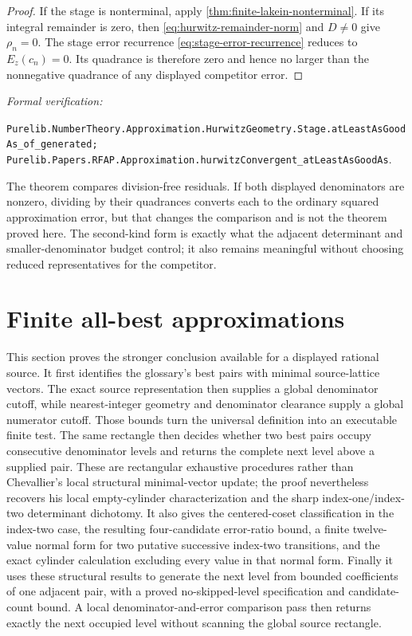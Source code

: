 \documentclass[11pt]{article}
\newcommand{\leanref}[1]{\par\smallskip\noindent
  \emph{Formal verification:}\par\nobreak
  {\raggedright\nolinkurl{#1}.\par}}
\begin{document}
\begin{proof}
If the stage is nonterminal, apply
\cref{thm:finite-lakein-nonterminal}.  If its integral remainder is zero,
then \eqref{eq:hurwitz-remainder-norm} and $D\ne0$ give $\rho_n=0$.  The
stage error recurrence \eqref{eq:stage-error-recurrence} reduces to
$E_z(c_n)=0$.  Its quadrance is therefore zero and hence no larger than the
nonnegative quadrance of any displayed competitor error.
\end{proof}

\leanref{Purelib.NumberTheory.Approximation.HurwitzGeometry.Stage.atLeastAsGoodAs_of_generated;
Purelib.Papers.RFAP.Approximation.hurwitzConvergent_atLeastAsGoodAs}

The theorem compares division-free residuals.  If both displayed
denominators are nonzero, dividing by their quadrances converts each to the
ordinary squared approximation error, but that changes the comparison and
is not the theorem proved here.  The second-kind form is exactly what the
adjacent determinant and smaller-denominator budget control; it also remains
meaningful without choosing reduced representatives for the competitor.

\section{Finite all-best approximations}
\label{sec:all-best}

This section proves the stronger conclusion available for a displayed
rational source.  It first identifies the glossary's best pairs with minimal
source-lattice vectors.  The exact source representation then supplies a
global denominator cutoff, while nearest-integer geometry and denominator
clearance supply a global numerator cutoff.  Those bounds turn the universal
definition into an executable finite test.  The same rectangle then decides
whether two best pairs occupy consecutive denominator levels and returns the
complete next level above a supplied pair.  These are rectangular exhaustive
procedures rather than Chevallier's local structural minimal-vector update;
the proof nevertheless recovers his local empty-cylinder characterization and
the sharp index-one/index-two determinant dichotomy.  It also gives the
centered-coset classification in the index-two case, the resulting
four-candidate error-ratio bound, a finite twelve-value normal form for
two putative successive index-two transitions, and the exact cylinder
calculation excluding every value in that normal form.  Finally it uses these
structural results to generate the next level from bounded coefficients of one
adjacent pair, with a proved no-skipped-level specification and candidate-count
bound.  A local denominator-and-error comparison pass then returns exactly the
next occupied level without scanning the global source rectangle.
\end{document}
